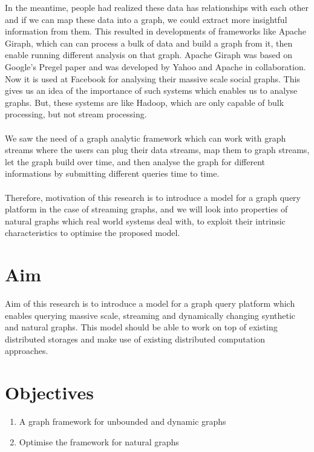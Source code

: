 \documentclass[12pt]{report}
\numberwithin{figure}{section}
\numberwithin{table}{section}
\begin{document}
In the meantime, people had realized these data has relationships with each other and if we can map these data into a graph, we could extract more insightful information from them. This resulted in developments of frameworks like Apache Giraph, which can can process a bulk of data and build a graph from it, then enable running different analysis on that graph. Apache Giraph was based on Google's Pregel\cite{Pregel} paper and was developed by Yahoo and Apache in collaboration. Now it is used at Facebook\cite{Facebook} for analysing their massive scale social graphs. This gives us an idea of the importance of such systems which enables us to analyse graphs.  But, these systems are like Hadoop, which are only capable of bulk processing, but not stream processing.

\paragraph{}

We saw the need of a graph analytic framework which can work with graph streams where the users can plug their data streams, map them to graph streams, let the graph build over time, and then analyse the graph for different informations by submitting different queries time to time.

\paragraph{}

Therefore, motivation of this research is to introduce a model for a graph query platform in the case of streaming graphs, and we will look into properties of natural graphs which real world systems deal with, to exploit their intrinsic characteristics to optimise the proposed model.

\section{Aim} 
Aim of this research is to introduce a model for a graph query platform which enables querying massive scale, streaming and dynamically changing synthetic  and natural graphs. This model should be able to work on top of existing distributed storages and make use of existing distributed computation approaches.

\section{Objectives}
\begin{enumerate}
\item A graph framework for unbounded and dynamic graphs
\item Optimise the framework for natural graphs
\end{enumerate}
\end{document}
